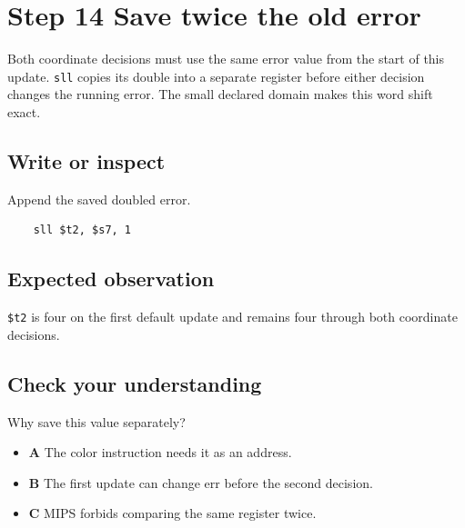 \section{Step 14 Save twice the old
  error}\label{007-bresenham-line-s14-step-14-save-twice-the-old-error}

Both coordinate decisions must use the same error value from the start
of this update. \texttt{sll} copies its double into a separate register
before either decision changes the running error. The small declared
domain makes this word shift exact.

\subsection{Write or
  inspect}\label{007-bresenham-line-s14-write-or-inspect}

Append the saved doubled error.

\begin{verbatim}
    sll $t2, $s7, 1
\end{verbatim}

\subsection{Expected
  observation}\label{007-bresenham-line-s14-expected-observation}

\texttt{\$t2} is four on the first default update and remains four
through both coordinate decisions.

\subsection{Check your
  understanding}\label{007-bresenham-line-s14-check-your-understanding}

Why save this value separately?

\begin{itemize}
  \tightlist
  \item
        \textbf{A} The color instruction needs it as an address.
  \item
        \textbf{B} The first update can change err before the second decision.
  \item
        \textbf{C} MIPS forbids comparing the same register twice.
\end{itemize}
